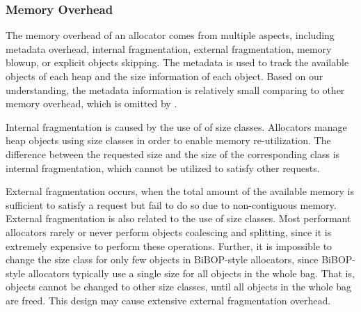 \subsubsection{Memory Overhead}

The memory overhead of an allocator comes from multiple aspects, including metadata overhead, internal fragmentation, external fragmentation, memory blowup, or explicit objects skipping. The metadata is used to track the available objects of each heap and the size information of each object. Based on our understanding, the metadata information is relatively small comparing to other memory overhead, which is omitted by \MP{}. 

Internal fragmentation is caused by the use of of size classes. Allocators manage heap objects using size classes in order to enable memory re-utilization. The difference between the requested size and the size of the corresponding class is internal fragmentation, which cannot be utilized to satisfy other requests. 

External fragmentation occurs, when the total amount of the available memory is sufficient to satisfy a request but fail to do so due to non-contiguous memory. External fragmentation is also related to the use of size classes. Most performant allocators rarely or never perform objects coalescing and splitting, since it is extremely expensive to perform these operations. Further, it is impossible to change the size class for only few objects in BiBOP-style allocators, since BiBOP-style allocators typically use a single size for all objects in the whole bag. That is, objects cannot be changed to other size classes, until all objects in the whole bag are freed. This design may cause extensive external fragmentation overhead. 

